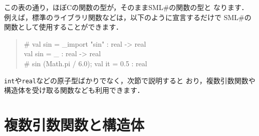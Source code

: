 \documentclass{jbook}
\newcommand{\smlsharp}{SML\#}
\newenvironment{program}{\begin{tt}\begin{quote}}{\end{quote}\end{tt}}
\begin{document}
	この表の通り，ほぼCの関数の型が，そのまま\smlsharp{}の関数の型と
なります．
	例えば，標準のライブラリ関数などは，以下のように宣言するだけで
\smlsharp{}の関数として使用することができます．
\begin{program}
\# val sin = \_import "sin" : real -> real\\
val sin = \_ : real -> real\\
\# sin (Math.pi / 6.0);
val it = 0.5 : real
\end{program}
	{\tt int}や{\tt real}などの原子型ばかりでなく，次節で説明すると
おり，複数引数関数や構造体を受け取る関数なども利用できます．

\section{複数引数関数と構造体}
\label{sec:extensionStructFunction}
\end{document}
